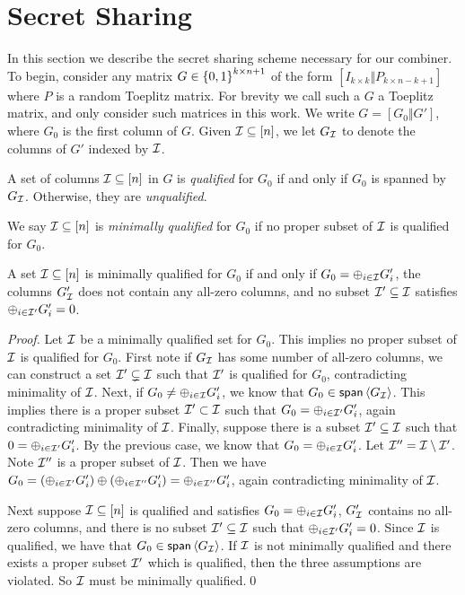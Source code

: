 \section{Secret Sharing}
In this section we describe the secret sharing scheme necessary for our combiner.
To begin, consider any matrix $G \in {\{0,1\}}^{k\times n+1}$ of the form $[I_{k\times k}\Vert P_{k\times n-k+1}]$ where $P$ is a random Toeplitz matrix.
For brevity we call such a $G$ a Toeplitz matrix, and only consider such matrices in this work.
We write $G = [G_0\Vert G']$, where $G_0$ is the first column of $G$.
Given ${\mathcal I} \subseteq [n]$, we let $G_{\mathcal I}$ to denote the columns of $G'$ indexed by ${\mathcal I}$.

\begin{definition}\label{def:qual}
	A set of columns ${\mathcal I} \subseteq [n]$ in $G$ is {\em qualified} for $G_0$ if and only if $G_0$ is spanned by $G_{\mathcal I}$.
	Otherwise, they are {\em unqualified}.
	
	We say ${\mathcal I} \subseteq [n]$ is {\em minimally qualified} for $G_0$ if no proper subset of ${\mathcal I}$ is qualified for $G_0$.
\end{definition}

\begin{lemma}\label{lem:min-qual-g}
	A set ${\mathcal I} \subseteq [n]$ is minimally qualified for $G_0$ if and only if $G_0 = \oplus_{i \in {\mathcal I}}G_i'$, the columns $G_{\mathcal I}'$ does not contain any all-zero columns, and no subset ${\mathcal I}' \subseteq {\mathcal I}$ satisfies $\oplus_{i \in {\mathcal I}'} G_i'=0$.
\end{lemma}
\begin{proof}
	Let ${\mathcal I}$ be a minimally qualified set for $G_0$.
	This implies no proper subset of ${\mathcal I}$ is qualified for $G_0$.
	First note if $G_{\mathcal I}$ has some number of all-zero columns, we can construct a set ${\mathcal I}' \subsetneq {\mathcal I}$ such that ${\mathcal I}'$ is qualified for $G_0$, contradicting minimality of ${\mathcal I}$.
	Next, if $G_0 \neq \oplus_{i \in {\mathcal I}} G_i'$, we know that $G_0 \in \mathsf{span}\left\langle {G_\ensuremath{{\mathcal I}}} \right\rangle$.
	This implies there is a proper subset ${\mathcal I}' \subset {\mathcal I}$ such that $G_0 = \oplus_{i \in {\mathcal I}'} G_i'$, again contradicting minimality of ${\mathcal I}$.
	Finally, suppose there is a subset ${\mathcal I}' \subseteq {\mathcal I}$ such that $0 = \oplus_{i \in {\mathcal I}'} G_i'$.
	By the previous case, we know that $G_0 = \oplus_{i \in {\mathcal I}} G_i'$.
	Let ${\mathcal I}'' = {\mathcal I} \setminus {\mathcal I}'$.
	Note ${\mathcal I}''$ is a proper subset of ${\mathcal I}$.
	Then we have $G_0 = (\oplus_{i \in {\mathcal I}'} G_i') \oplus (\oplus_{i \in {\mathcal I}''} G_i') = \oplus_{i \in {\mathcal I}''} G_i'$, again contradicting minimality of ${\mathcal I}$.
	
	Next suppose ${\mathcal I} \subseteq [n]$ is qualified and satisfies $G_0 = \oplus_{i \in {\mathcal I}} G'_i$, $G'_{\mathcal I}$ contains no all-zero columns, and there is no subset ${\mathcal I}' \subseteq {\mathcal I}$ such that $\oplus_{i \in {\mathcal I}'} G_i' = 0$.
	Since ${\mathcal I}$ is qualified, we have that $G_0 \in \mathsf{span}\left\langle {G_\ensuremath{{\mathcal I}}} \right\rangle$.
	If ${\mathcal I}$ is not minimally qualified and there exists a proper subset ${\mathcal I}'$ which is qualified, then the three assumptions are violated.
	So ${\mathcal I}$ must be minimally qualified.\qed
\end{proof}


